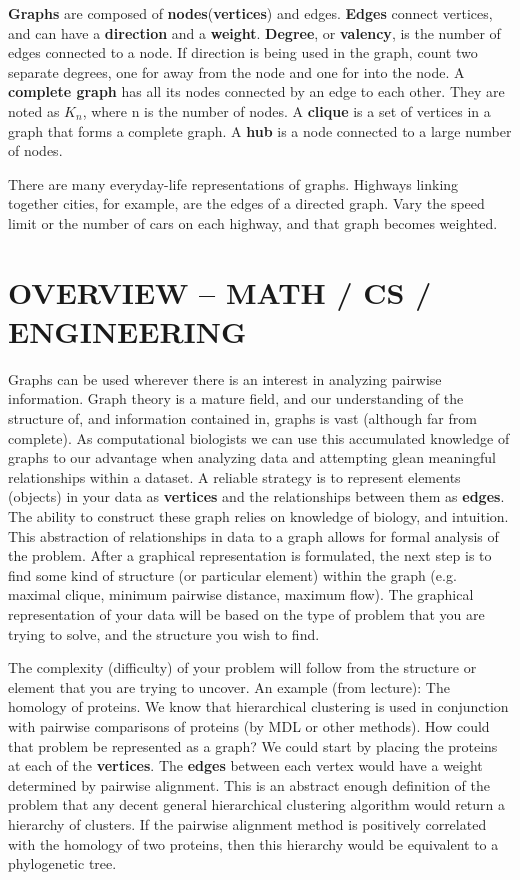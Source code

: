 \documentclass[11pt]{article}
\begin{document}
{\bf Graphs} are composed of {\bf nodes}({\bf vertices}) and edges. {\bf Edges} connect vertices, 
and can have a {\bf direction} and a {\bf weight}. {\bf Degree}, or {\bf valency}, 
is the number of edges connected to a node. 
If direction is being used in the graph, count two separate degrees, 
one for away from the node and one for into the node. 
A {\bf complete graph} has all its nodes connected by an edge to each other. 
They are noted as $K_{n}$, where n is the number of nodes. 
A {\bf clique} is a set of vertices in a graph that forms a complete graph. 
A {\bf hub} is a node connected to a large number of nodes.

There are many everyday-life representations of graphs.  
Highways linking together cities, for example, are the edges of a directed graph.  
Vary the speed limit or the number of cars on each highway, and that graph 
becomes weighted.

\section*{OVERVIEW -- MATH / CS / ENGINEERING}

Graphs can be used wherever there is an interest in analyzing pairwise information. 
Graph theory is a mature field, and our understanding of the structure of, 
and information contained in, graphs is vast (although far from complete). 
As computational biologists we can use this accumulated knowledge of graphs to 
our advantage when analyzing data and attempting glean meaningful relationships 
within a dataset. A reliable strategy is to represent elements (objects) in 
your data as {\bf vertices} and the relationships between them as {\bf edges}. 
The ability to construct these graph relies on knowledge of biology, and intuition. 
This abstraction of relationships in data to a graph allows for formal analysis of the problem. 
After a graphical representation is formulated, the next step is to find some kind of structure 
(or particular element) within the graph (e.g. maximal clique, minimum pairwise distance, maximum flow). 
The graphical representation of your data will be based on the type of problem that you are trying to solve, 
and the structure you wish to find. 

The complexity (difficulty) of your problem will follow from the structure or element 
that you are trying to uncover. 
An example (from lecture): The homology of proteins. We know that hierarchical clustering 
is used in conjunction with pairwise comparisons of proteins (by MDL or other methods). 
How could that problem be represented as a graph? We could start by placing the 
proteins at each of the {\bf vertices}. The {\bf edges} between each vertex would have a 
weight determined by pairwise alignment. This is an abstract enough definition of 
the problem that any decent general hierarchical clustering algorithm would return 
a hierarchy of clusters. If the pairwise alignment method is positively correlated with the 
homology of two proteins, then this hierarchy would be equivalent to a phylogenetic tree. 
\end{document}

